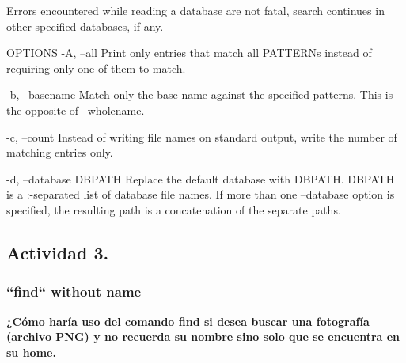\documentclass[a4paper,11pt,spanish]{article} %
\begin{document}
       Errors encountered while reading a database are not fatal, search continues in other
       specified databases, if any.

OPTIONS
       -A, --all
              Print only entries that match all PATTERNs instead of requiring only one of 
              them to match.

       -b, --basename
              Match only the base name against the specified patterns.  
              This is the opposite of --wholename.

       -c, --count
              Instead of writing file names on standard output, write the number of matching 
              entries only.

       -d, --database DBPATH
              Replace the default database with DBPATH.  DBPATH is a :-separated list of database 
              file names.  If more than one --database option is specified, the
              resulting path is a concatenation of the separate paths.



\subsection{Actividad 3.}

\subsubsection{``find`` without name}

\textbf{¿Cómo haría uso del comando find si desea buscar una fotografía (archivo PNG)
y no recuerda su nombre sino solo que se encuentra en su home.}
\end{document}
